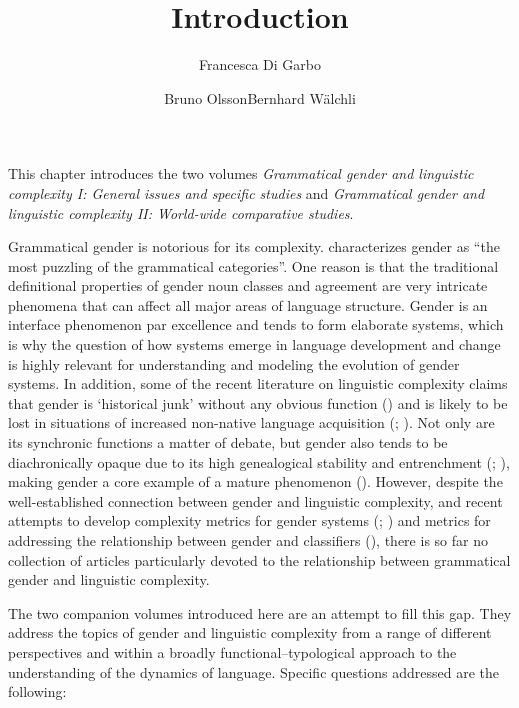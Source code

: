 \documentclass[output=collectionpaper]{langsci/langscibook}
\title{Introduction}
\author{Francesca Di Garbo\affiliation{Stockholm University}\and Bruno Olsson\affiliation{Australian National University}\lastand Bernhard Wälchli\affiliation{Stockholm University}}
\begin{document}
\maketitle

\noindent%
This chapter introduces the two volumes \textit{Grammatical gender and linguistic complexity I: General issues and specific studies} and \textit{Grammatical gender and linguistic complexity II: World-wide comparative studies}.

Grammatical gender is notorious for its complexity. \citet[1]{Corbett1991} characterizes gender as ``the most puzzling of the grammatical categories''. One reason is that the traditional definitional properties of gender \textendash{} noun classes and agreement \textendash{} are very intricate phenomena that can affect all major areas of language structure. Gender is an interface phenomenon par excellence and tends to form elaborate systems, which is why the question of how systems emerge in language development and change is highly relevant for understanding and modeling the evolution of gender systems. In addition, some of the recent literature on linguistic complexity claims that gender is `historical junk’ without any obvious function (\citealt[156]{Trudgill2011}) and is likely to be lost in situations of increased non-native language acquisition (\citealt{McWhorter2001,McWhorter2007}; \citealt{Trudgill1999}). Not only are its synchronic functions a matter of debate, but gender also tends to be diachronically opaque due to its high genealogical stability and entrenchment (\citealt[142]{Nichols1992}; \citealt{Nichols2003}), making gender a core example of a mature phenomenon (\citealt{Dahl2004}). However, despite the well-established connection between gender and linguistic complexity, and recent attempts to develop complexity metrics for gender systems (\citealt{Audring2014,Audring2017}; \citealt{DiGarbo2016}) and metrics for addressing the relationship between gender and classifiers (\citealt{Passer2016b}), there is so far no collection of articles particularly devoted to the relationship between grammatical gender and linguistic complexity.

The two companion volumes introduced here are an attempt to fill this gap. They address the topics of gender and linguistic complexity from a range of different perspectives and within a broadly functional--typological approach to the understanding of the dynamics of language. Specific questions addressed are the following:
\end{document}
